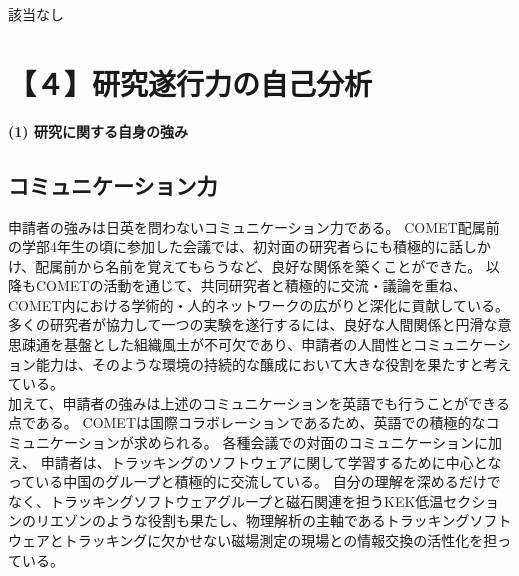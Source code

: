\documentclass[11pt,a4j,dvipdfmx]{jarticle} 					%
\newcommand{\研究課題名}{ミューオン電子転換探索の感度向上に向けた解析手法の開発}
\newcommand{\研究機関名}{大阪大学}
\newcommand{\研究代表者氏名}{高見 翔太   }
\newcommand{\mysubsection}[1]{\vspace{-20pt}\subsection*{\colorbox{cyan!15}{\normalsize{#1}}}\vspace{-0.2cm}}
\begin{document}
該当なし
%




\section{【４】研究遂行力の自己分析}

\noindent
\textbf{(1) 研究に関する自身の強み}\\
\vspace{-0.5cm}
\mysubsection{コミュニケーション力}
申請者の強みは日英を問わないコミュニケーション力である。
COMET配属前の学部4年生の頃に参加した会議では、初対面の研究者らにも積極的に話しかけ、配属前から名前を覚えてもらうなど、良好な関係を築くことができた。
以降もCOMETの活動を通じて、共同研究者と積極的に交流・議論を重ね、COMET内における学術的・人的ネットワークの広がりと深化に貢献している。
多くの研究者が協力して一つの実験を遂行するには、良好な人間関係と円滑な意思疎通を基盤とした組織風土が不可欠であり、申請者の人間性とコミュニケーション能力は、そのような環境の持続的な醸成において大きな役割を果たすと考えている。\\
加えて、申請者の強みは上述のコミュニケーションを英語でも行うことができる点である。
COMETは国際コラボレーションであるため、英語での積極的なコミュニケーションが求められる。
各種会議での対面のコミュニケーションに加え、
申請者は、トラッキングのソフトウェアに関して学習するために中心となっている中国のグループと積極的に交流している。
自分の理解を深めるだけでなく、トラッキングソフトウェアグループと磁石関連を担うKEK低温セクションのリエゾンのような役割も果たし、物理解析の主軸であるトラッキングソフトウェアとトラッキングに欠かせない磁場測定の現場との情報交換の活性化を担っている。
	
\end{document}
